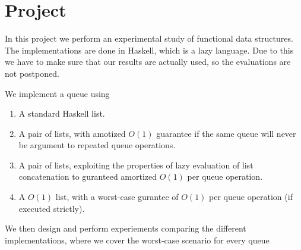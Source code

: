 \section*{Project}
In this project we perform an experimental study of functional data structures. The implementations are done in Haskell, which is a lazy language. Due to this we have to make sure that our results are actually used, so the evaluations are not postponed.

We implement a queue using
\begin{enumerate}
 \item A standard Haskell list.
 \item A pair of lists, with amotized $O(1)$ guarantee if the same queue will never be argument to repeated queue operations.
 \item A pair of lists, exploiting the properties of lazy evaluation of list concatenation to guranteed amortized $O(1)$ per queue operation.
 \item A $O(1)$ list, with a worst-case gurantee of $O(1)$ per queue operation (if executed strictly).
\end{enumerate}

We then design and perform experiements comparing the different implementations, where we cover the worst-case scenario for every queue